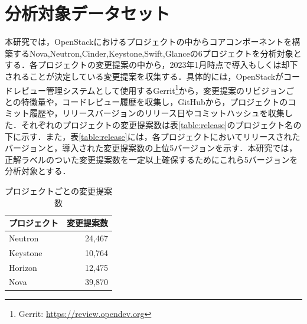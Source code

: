 \documentclass[T,J]{fose} %
\begin{document}
% 
 
 
\section{分析対象データセット}\label{chap:dataset}

本研究では，OpenStackにおけるプロジェクトの中からコアコンポーネントを構築するNova,Neutron,Cinder,Keystone,Swift,Glanceの6プロジェクトを分析対象とする．各プロジェクトの変更提案の中から，2023年1月時点で導入もしくは却下されることが決定している変更提案を収集する．具体的には，OpenStackがコードレビュー管理システムとして使用するGerrit\footnote{Gerrit: \url{https://review.opendev.org}}から，変更提案のリビジョンごとの特徴量や，コードレビュー履歴を収集し，GitHubから，プロジェクトのコミット履歴や，リリースバージョンのリリース日やコミットハッシュを収集した．それぞれのプロジェクトの変更提案数は表\ref{table:release}のプロジェクト名の下に示す．また，表\ref{table:release}には，各プロジェクトにおいてリリースされたバージョンと，導入された変更提案数の上位5バージョンを示す．本研究では，正解ラベルのついた変更提案数を一定以上確保するためにこれら5バージョンを分析対象とする．

\begin{table}[t]
\centering
  \caption{プロジェクトごとの変更提案数}
  \vspace{0.5zh}
  \label{table:henkou}
  \begin{tabular}{l|r}  \hline
    \multicolumn{1}{c|}{プロジェクト} & \multicolumn{1}{|c}{変更提案数} \\ \hline \hline
    Neutron & 24,467 \\ \hline
    Keystone & 10,764 \\ \hline
    Horizon & 12,475 \\ \hline
    Nova & 39,870 \\ \hline
  \end{tabular}
\end{table}
\end{document}
